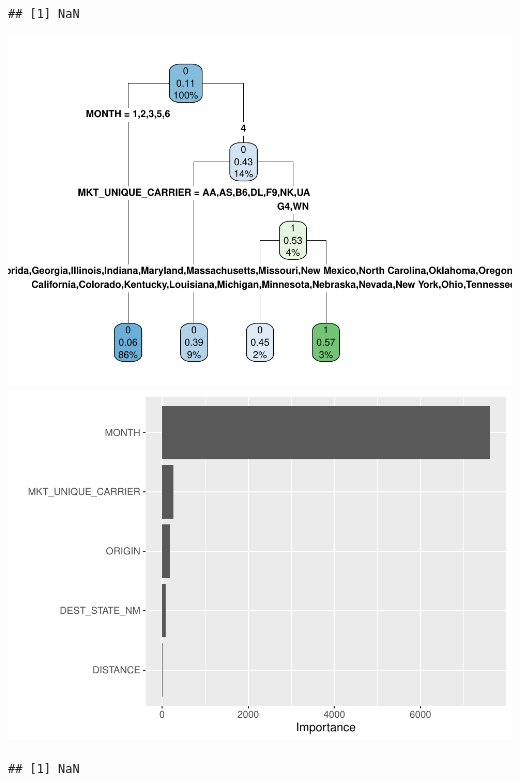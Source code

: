 \documentclass[
]{article}
\begin{document}
\begin{verbatim}
## [1] NaN
\end{verbatim}

\includegraphics{final-project_files/figure-latex/cancellation-tree-3.pdf}
\includegraphics{final-project_files/figure-latex/cancellation-tree-4.pdf}

\begin{verbatim}
## [1] NaN
\end{verbatim}
\end{document}
